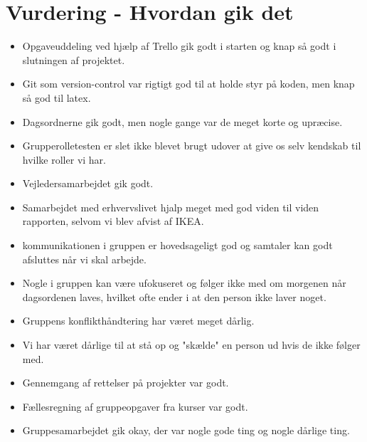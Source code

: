 \documentclass[oneside,a4paper,titlepage]{article}
\begin{document}


\section{Vurdering - Hvordan gik det}
\begin{itemize}
  \item Opgaveuddeling ved hjælp af Trello gik godt i starten og knap så godt i slutningen af projektet.
  \item Git som version-control var rigtigt god til at holde styr på koden, men knap så god til latex.
  \item Dagsordnerne gik godt, men nogle gange var de meget korte og upræcise.
  \item Grupperolletesten er slet ikke blevet brugt udover at give os selv kendskab til hvilke roller vi har.
  \item Vejledersamarbejdet gik godt.
  \item Samarbejdet med erhvervslivet hjalp meget med god viden til viden rapporten, selvom vi blev afvist af IKEA.
  \item kommunikationen i gruppen er hovedsageligt god og samtaler kan godt afsluttes når vi skal arbejde. 
  \item Nogle i gruppen kan være ufokuseret og følger ikke med om morgenen når dagsordenen laves, hvilket ofte ender i at den person ikke laver noget.
  \item Gruppens konflikthåndtering har været meget dårlig.
  \item Vi har været dårlige til at stå op og "skælde" en person ud hvis de ikke følger med.
  \item Gennemgang af rettelser på projekter var godt.
  \item Fællesregning af gruppeopgaver fra kurser var godt.
  \item Gruppesamarbejdet gik okay, der var nogle gode ting og nogle dårlige ting. 
\end{itemize}
\end{document}
